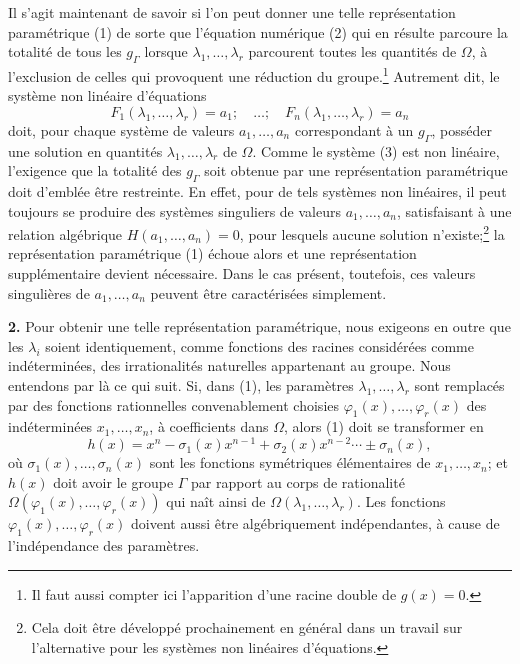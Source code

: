 Il s'agit maintenant de savoir si l'on peut donner une telle représentation paramétrique (1) de sorte que l'équation numérique (2) qui en résulte parcoure la totalité de tous les $g_\Gamma$ lorsque $\lambda_1,
\ldots,\lambda_r$ parcourent toutes les quantités de $\Omega$, à l'exclusion de celles qui provoquent une réduction du groupe.\footnote{Il faut aussi compter ici l'apparition d'une racine double de $g(x)=0$.} Autrement dit, le système non linéaire d'équations
\begin{equation}\tag{3}
F_1(\lambda_1,
\ldots,\lambda_r)=a_1;\quad \ldots;\quad F_n(\lambda_1,
\ldots,\lambda_r)=a_n
\end{equation}
doit, pour chaque système de valeurs $a_1,
\ldots,a_n$ correspondant à un $g_\Gamma$, posséder une solution en quantités $\lambda_1,
\ldots,\lambda_r$ de $\Omega$. Comme le système (3) est non linéaire, l'exigence que la totalité des $g_\Gamma$ soit obtenue par une représentation paramétrique doit d'emblée être restreinte. En effet, pour de tels systèmes non linéaires, il peut toujours se produire des systèmes singuliers de valeurs $a_1,
\ldots,a_n$, satisfaisant à une relation algébrique $H(a_1,
\ldots,a_n)=0$, pour lesquels aucune solution n'existe;\footnote{Cela doit être développé prochainement en général dans un travail sur l'\og{}alternative pour les systèmes non linéaires d'équations\fg{}.} la représentation paramétrique (1) échoue alors et une représentation supplémentaire devient nécessaire. Dans le cas présent, toutefois, ces valeurs singulières de $a_1,
\ldots,a_n$ peuvent être caractérisées simplement.

\textbf{2.} Pour obtenir une telle représentation paramétrique, nous exigeons en outre que les $\lambda_i$ soient identiquement, comme fonctions des racines considérées comme indéterminées, des irrationalités naturelles appartenant au groupe. Nous entendons par là ce qui suit. Si, dans (1), les paramètres $\lambda_1,
\ldots,\lambda_r$ sont remplacés par des fonctions rationnelles convenablement choisies $\varphi_1(x),\ldots,\varphi_r(x)$ des indéterminées $x_1,
\ldots,x_n$, à coefficients dans $\Omega$, alors (1) doit se transformer en
\begin{equation}\tag{4}
h(x)=x^n-\sigma_1(x)x^{n-1}+\sigma_2(x)x^{n-2}\cdots \pm \sigma_n(x),
\end{equation}
où $\sigma_1(x),\ldots,\sigma_n(x)$ sont les fonctions symétriques élémentaires de $x_1,
\ldots,x_n$; et $h(x)$ doit avoir le groupe $\Gamma$ par rapport au corps de rationalité $\Omega(\varphi_1(x),\ldots,\varphi_r(x))$ qui naît ainsi de $\Omega(\lambda_1,
\ldots,\lambda_r)$. Les fonctions $\varphi_1(x),\ldots,\varphi_r(x)$ doivent aussi être algébriquement indépendantes, à cause de l'indépendance des paramètres.

